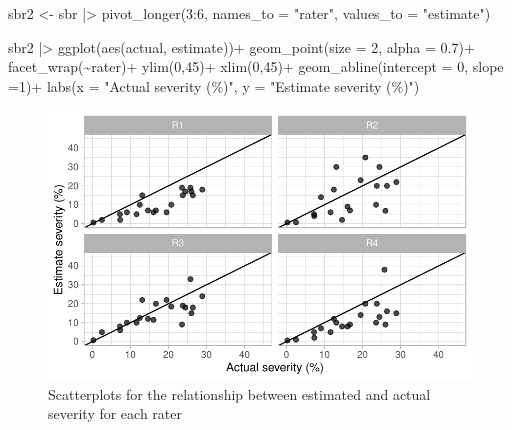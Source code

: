 \documentclass[
  letterpaper,
  DIV=11,
  numbers=noendperiod]{scrreprt}
\newenvironment{Shaded}{\begin{snugshade}}{\end{snugshade}}
\newcommand{\AttributeTok}[1]{\textcolor[rgb]{0.40,0.45,0.13}{#1}}
\newcommand{\DecValTok}[1]{\textcolor[rgb]{0.68,0.00,0.00}{#1}}
\newcommand{\FloatTok}[1]{\textcolor[rgb]{0.68,0.00,0.00}{#1}}
\newcommand{\FunctionTok}[1]{\textcolor[rgb]{0.28,0.35,0.67}{#1}}
\newcommand{\NormalTok}[1]{\textcolor[rgb]{0.00,0.23,0.31}{#1}}
\newcommand{\OtherTok}[1]{\textcolor[rgb]{0.00,0.23,0.31}{#1}}
\newcommand{\SpecialCharTok}[1]{\textcolor[rgb]{0.37,0.37,0.37}{#1}}
\newcommand{\StringTok}[1]{\textcolor[rgb]{0.13,0.47,0.30}{#1}}
\begin{document}
\begin{Shaded}
\begin{Highlighting}[]
\NormalTok{sbr2 }\OtherTok{\textless{}{-}}\NormalTok{ sbr }\SpecialCharTok{|\textgreater{}} 
  \FunctionTok{pivot\_longer}\NormalTok{(}\DecValTok{3}\SpecialCharTok{:}\DecValTok{6}\NormalTok{, }\AttributeTok{names\_to =} \StringTok{"rater"}\NormalTok{,}
               \AttributeTok{values\_to =} \StringTok{"estimate"}\NormalTok{) }

\NormalTok{sbr2 }\SpecialCharTok{|\textgreater{}} 
  \FunctionTok{ggplot}\NormalTok{(}\FunctionTok{aes}\NormalTok{(actual, estimate))}\SpecialCharTok{+}
  \FunctionTok{geom\_point}\NormalTok{(}\AttributeTok{size =} \DecValTok{2}\NormalTok{, }\AttributeTok{alpha =} \FloatTok{0.7}\NormalTok{)}\SpecialCharTok{+}
  \FunctionTok{facet\_wrap}\NormalTok{(}\SpecialCharTok{\textasciitilde{}}\NormalTok{rater)}\SpecialCharTok{+}
  \FunctionTok{ylim}\NormalTok{(}\DecValTok{0}\NormalTok{,}\DecValTok{45}\NormalTok{)}\SpecialCharTok{+}
  \FunctionTok{xlim}\NormalTok{(}\DecValTok{0}\NormalTok{,}\DecValTok{45}\NormalTok{)}\SpecialCharTok{+}
  \FunctionTok{geom\_abline}\NormalTok{(}\AttributeTok{intercept =} \DecValTok{0}\NormalTok{, }\AttributeTok{slope =}\DecValTok{1}\NormalTok{)}\SpecialCharTok{+}
  \FunctionTok{labs}\NormalTok{(}\AttributeTok{x =} \StringTok{"Actual severity (\%)"}\NormalTok{,}
       \AttributeTok{y =} \StringTok{"Estimate severity (\%)"}\NormalTok{)}
\end{Highlighting}
\end{Shaded}

\begin{figure}[H]

{\centering \includegraphics{data-accuracy_files/figure-pdf/fig-scater-1.pdf}

}

\caption{\label{fig-scater}Scatterplots for the relationship between
estimated and actual severity for each rater}

\end{figure}
\end{document}
